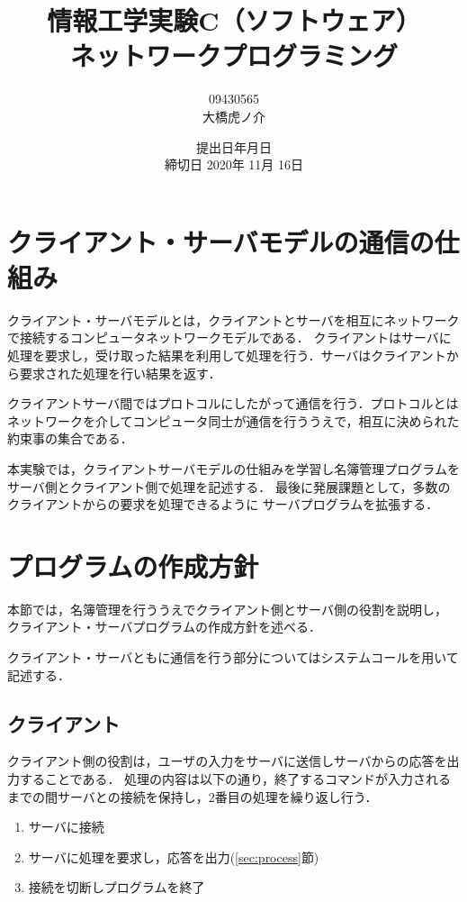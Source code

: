 \documentclass[11pt]{jarticle}
\begin{document}
\title{情報工学実験C（ソフトウェア）\\ネットワークプログラミング}
\author{09430565\\大橋虎ノ介}
\date{提出日\number\year 年\number\month 月\number\day 日\\
締切日 2020年 11月 16日}

\maketitle
\newpage

\section{クライアント・サーバモデルの通信の仕組み}

クライアント・サーバモデルとは，クライアントとサーバを相互にネットワークで接続するコンピュータネットワークモデルである．
クライアントはサーバに処理を要求し，受け取った結果を利用して処理を行う．サーバはクライアントから要求された処理を行い結果を返す．

クライアントサーバ間ではプロトコルにしたがって通信を行う．プロトコルとはネットワークを介してコンピュータ同士が通信を行ううえで，相互に決められた約束事の集合である．

本実験では，クライアントサーバモデルの仕組みを学習し名簿管理プログラムを
サーバ側とクライアント側で処理を記述する．
最後に発展課題として，多数のクライアントからの要求を処理できるように
サーバプログラムを拡張する．

\section{プログラムの作成方針}\label{sec:policy}

本節では，名簿管理を行ううえでクライアント側とサーバ側の役割を説明し，
クライアント・サーバプログラムの作成方針を述べる．

クライアント・サーバともに通信を行う部分についてはシステムコールを用いて記述する．

\subsection{クライアント}

クライアント側の役割は，ユーザの入力をサーバに送信しサーバからの応答を出力することである．
処理の内容は以下の通り，終了するコマンドが入力されるまでの間サーバとの接続を保持し，2番目の処理を繰り返し行う．

\begin{enumerate}
    \item サーバに接続
    \item サーバに処理を要求し，応答を出力(\ref{sec:process}節)
    \item 接続を切断しプログラムを終了
\end{enumerate}
\end{document}
